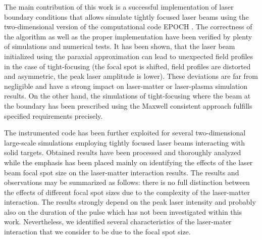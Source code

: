 The main contribution of this work is a successful implementation of laser boundary conditions that allows simulate tightly focused laser beams using the two-dimensional version of the computational code EPOCH \cite{bennett}. The correctness of the algorithm as well as the proper implementation have been verified by plenty of simulations and numerical tests. It has been shown, that the laser beam initialized using the paraxial approximation can lead to unexpected field profiles in the case of tight-focusing (the focal spot is shifted, field profiles are distorted and asymmetric, the peak laser amplitude is lower). These deviations are far from negligible and have a strong impact on laser-matter or laser-plasma simulation results. On the other hand, the simulations of tight-focusing where the beam at the boundary has been prescribed using the Maxwell consistent approach \cite{Thiele2016} fulfills specified requirements precisely.

The instrumented code has been further exploited for several two-dimensional large-scale simulations employing tightly focused laser beams interacting with solid targets. Obtained results have been processed and thoroughly analyzed while the emphasis has been placed mainly on identifying the effects of the laser beam focal spot size on the laser-matter interaction results. The results and observations may be summarized as follows: there is no full distinction between the effects of different focal spot sizes due to the complexity of the laser-matter interaction. The results strongly depend on the peak laser intensity and probably also on the duration of the pulse which has not been investigated within this work. Nevertheless, we identified several characteristics of the laser-mater interaction that we consider to be due to the focal spot size.

